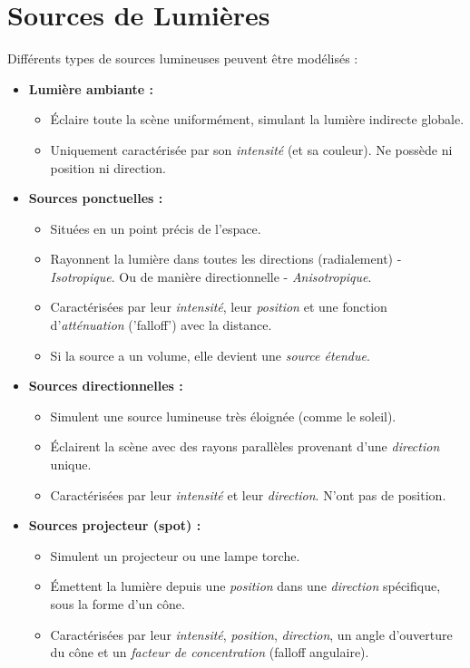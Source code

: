 \section{Sources de Lumières}
Différents types de sources lumineuses peuvent être modélisés :
\begin{itemize}
    \item \textbf{Lumière ambiante :}
        \begin{itemize}
            \item Éclaire toute la scène uniformément, simulant la lumière indirecte globale.
            \item Uniquement caractérisée par son \textit{intensité} (et sa couleur). Ne possède ni position ni direction.
        \end{itemize}
    \item \textbf{Sources ponctuelles :}
        \begin{itemize}
            \item Situées en un point précis de l'espace.
            \item Rayonnent la lumière dans toutes les directions (radialement) - \textit{Isotropique}. Ou de manière directionnelle - \textit{Anisotropique}.
            \item Caractérisées par leur \textit{intensité}, leur \textit{position} et une fonction d'\textit{atténuation} ('falloff') avec la distance.
            \item Si la source a un volume, elle devient une \textit{source étendue}.
        \end{itemize}
    \item \textbf{Sources directionnelles :}
        \begin{itemize}
            \item Simulent une source lumineuse très éloignée (comme le soleil).
            \item Éclairent la scène avec des rayons parallèles provenant d'une \textit{direction} unique.
            \item Caractérisées par leur \textit{intensité} et leur \textit{direction}. N'ont pas de position.
        \end{itemize}
    \item \textbf{Sources projecteur (spot) :}
        \begin{itemize}
            \item Simulent un projecteur ou une lampe torche.
            \item Émettent la lumière depuis une \textit{position} dans une \textit{direction} spécifique, sous la forme d'un cône.
            \item Caractérisées par leur \textit{intensité}, \textit{position}, \textit{direction}, un angle d'ouverture du cône et un \textit{facteur de concentration} (falloff angulaire).
        \end{itemize}
\end{itemize}
